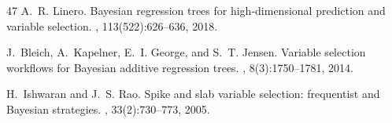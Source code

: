 \documentclass[11pt, a4paper]{article}
\begin{document}
\begin{thebibliography}{47}
A.~R. Linero.
\newblock Bayesian regression trees for high-dimensional prediction and variable selection.
, 113(522):626--636, 2018.

J.~Bleich, A.~Kapelner, E.~I. George, and S.~T. Jensen.
\newblock Variable selection workflows for Bayesian additive regression trees.
, 8(3):1750--1781, 2014.

H.~Ishwaran and J.~S. Rao.
\newblock Spike and slab variable selection: frequentist and Bayesian strategies.
, 33(2):730--773, 2005.

\end{thebibliography}
\end{document}
